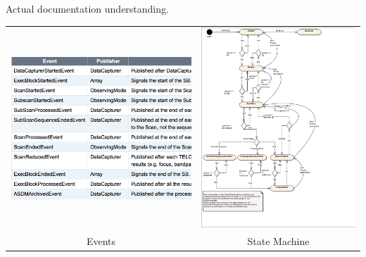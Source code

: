 \documentclass[11pt]{beamer}
\begin{document}
\begin{frame}{Actual documentation understanding.}
\centering
\begin{tabular}{ c c }
  \includegraphics[scale=0.35]{events.png} & \includegraphics[scale=0.2]{stateDiagram.pdf} \\
  Events & State Machine \\
\end{tabular}
\end{frame}
\end{document}
